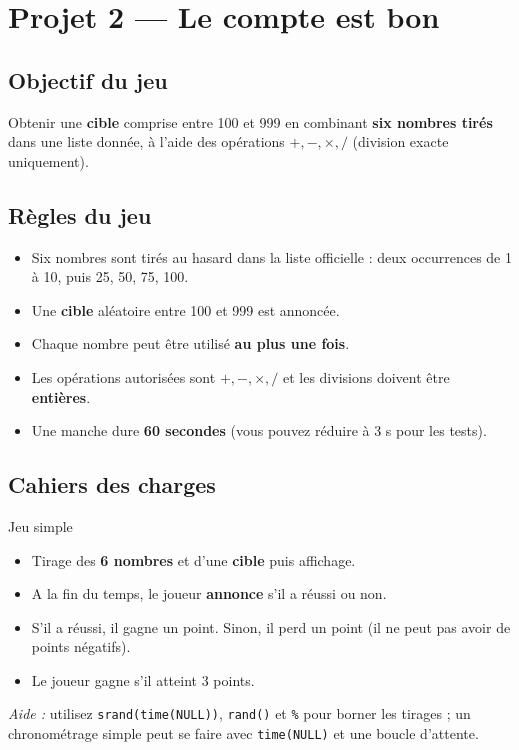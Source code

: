 \section{Projet 2 — Le compte est bon}

\subsection*{Objectif du jeu}
Obtenir une \textbf{cible} comprise entre 100 et 999 en combinant \textbf{six nombres tirés} dans une liste donnée, à l’aide des opérations $+,-,\times,/$ (division exacte uniquement).

\subsection*{Règles du jeu}
\begin{itemize}
  \item Six nombres sont tirés au hasard dans la liste officielle : deux occurrences de 1 à 10, puis 25, 50, 75, 100.
  \item Une \textbf{cible} aléatoire entre 100 et 999 est annoncée.
  \item Chaque nombre peut être utilisé \textbf{au plus une fois}.
  \item Les opérations autorisées sont $+,-,\times,/$ et les divisions doivent être \textbf{entières}.
  \item Une manche dure \textbf{60 secondes} (vous pouvez réduire à 3 s pour les tests).
\end{itemize}

\subsection*{Cahiers des charges} 
\begin{UPSTICahierDesCharges}{Jeu simple}
\begin{itemize}
  \item  Tirage des \textbf{6 nombres} et d'une \textbf{cible} puis affichage.
  \item A la fin du temps, le joueur \textbf{annonce} s'il a réussi ou non.
  \item S'il a réussi, il gagne un point. Sinon, il perd un point (il ne peut pas avoir de points négatifs).
  \item Le joueur gagne s'il atteint 3 points.
\end{itemize}

\textit{Aide :} utilisez \texttt{srand(time(NULL))}, \texttt{rand()} et \texttt{\%} pour borner les tirages ; un chronométrage simple peut se faire avec \texttt{time(NULL)} et une boucle d'attente.
\end{UPSTICahierDesCharges}

